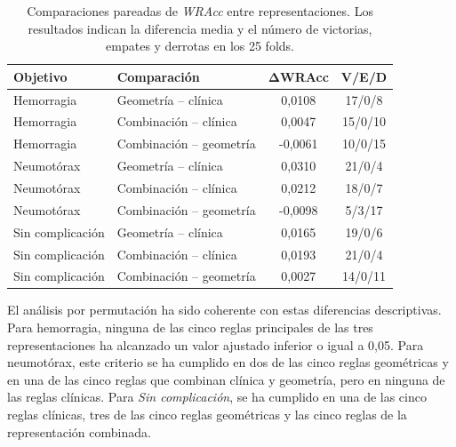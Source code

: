 \begin{table}[!htbp]
    \centering
    \small
    \caption{Comparaciones pareadas de \textit{WRAcc} entre representaciones. Los resultados indican la diferencia media y el número de victorias, empates y derrotas en los 25 folds.}
    \label{tab:sd_ablacion_pareada}
    \begin{tabular}{llcc}
        \hline
        \textbf{Objetivo} &
        \textbf{Comparación} &
        \(\boldsymbol{\Delta}\)\textbf{WRAcc} &
        \textbf{V/E/D} \\
        \hline

        Hemorragia &
        Geometría -- clínica &
        0,0108 &
        17/0/8 \\

        Hemorragia &
        Combinación -- clínica &
        0,0047 &
        15/0/10 \\

        Hemorragia &
        Combinación -- geometría &
        -0,0061 &
        10/0/15 \\
        \hline

        Neumotórax &
        Geometría -- clínica &
        0,0310 &
        21/0/4 \\

        Neumotórax &
        Combinación -- clínica &
        0,0212 &
        18/0/7 \\

        Neumotórax &
        Combinación -- geometría &
        -0,0098 &
        5/3/17 \\
        \hline

        Sin complicación &
        Geometría -- clínica &
        0,0165 &
        19/0/6 \\

        Sin complicación &
        Combinación -- clínica &
        0,0193 &
        21/0/4 \\

        Sin complicación &
        Combinación -- geometría &
        0,0027 &
        14/0/11 \\
        \hline
    \end{tabular}
\end{table}

El análisis por permutación ha sido coherente con estas diferencias descriptivas. Para hemorragia, ninguna de las cinco reglas principales de las tres representaciones ha alcanzado un valor ajustado inferior o igual a 0,05. Para neumotórax, este criterio se ha cumplido en dos de las cinco reglas geométricas y en una de las cinco reglas que combinan clínica y geometría, pero en ninguna de las reglas clínicas. Para \textit{Sin complicación}, se ha cumplido en una de las cinco reglas clínicas, tres de las cinco reglas geométricas y las cinco reglas de la representación combinada.

